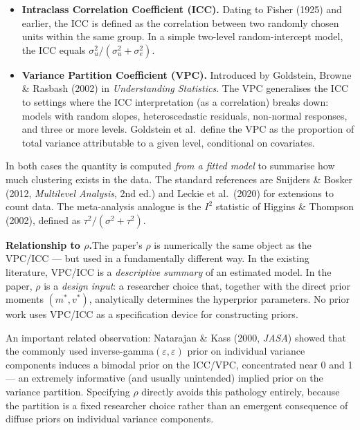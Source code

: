\documentclass[12pt,a4paper]{article}
\begin{document}
\begin{itemize}
  \item \textbf{Intraclass Correlation Coefficient (ICC).} Dating to Fisher
    (1925) and earlier, the ICC is defined as the correlation between two
    randomly chosen units within the same group. In a simple two-level
    random-intercept model, the ICC equals
    $\sigma^2_u / (\sigma^2_u + \sigma^2_e)$.

  \item \textbf{Variance Partition Coefficient (VPC).} Introduced by Goldstein,
    Browne \& Rasbash (2002) in \emph{Understanding Statistics}. The VPC
    generalises the ICC to settings where the ICC interpretation (as a
    correlation) breaks down: models with random slopes, heteroscedastic
    residuals, non-normal responses, and three or more levels. Goldstein et
    al.\ define the VPC as the proportion of total variance attributable to a
    given level, conditional on covariates.
\end{itemize}

In both cases the quantity is computed \emph{from a fitted model} to summarise
how much clustering exists in the data. The standard references are Snijders \&
Bosker (2012, \emph{Multilevel Analysis}, 2nd ed.) and Leckie et al.\ (2020)
for extensions to count data. The meta-analysis analogue is the $I^2$ statistic
of Higgins \& Thompson (2002), defined as
$\tau^2 / (\sigma^2 + \tau^2)$.

\medskip

\noindent\textbf{Relationship to $\rho$.}\quad The paper's $\rho$ is
numerically the same object as the VPC/ICC --- but used in a fundamentally
different way. In the existing literature, VPC/ICC is a \emph{descriptive
summary} of an estimated model. In the paper, $\rho$ is a \emph{design input}:
a researcher choice that, together with the direct prior moments $(m^*, v^*)$,
analytically determines the hyperprior parameters. No prior work uses VPC/ICC
as a specification device for constructing priors.

An important related observation: Natarajan \& Kass (2000, \emph{JASA}) showed
that the commonly used inverse-gamma$(\varepsilon, \varepsilon)$ prior on
individual variance components induces a bimodal prior on the ICC/VPC,
concentrated near 0 and 1 --- an extremely informative (and usually
unintended) implied prior on the variance partition. Specifying $\rho$ directly
avoids this pathology entirely, because the partition is a fixed researcher
choice rather than an emergent consequence of diffuse priors on individual
variance components.
\end{document}
